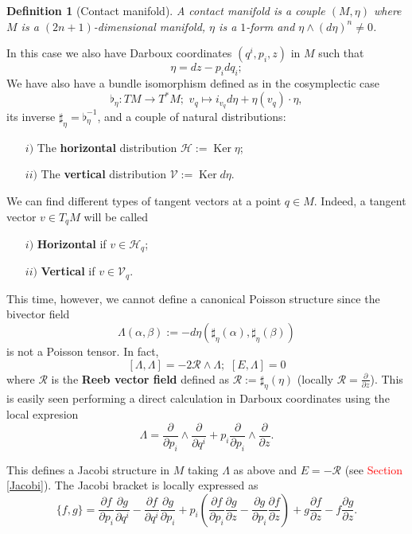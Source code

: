 \documentclass[12pt]{article}
\newtheorem{Def}{Definition}[section]
\renewcommand{\ker}{\operatorname{Ker}}
\begin{document}
\begin{Def}[Contact manifold] A
contact manifold is a couple $(M, \eta)$ where $M$ is a $(2n+1)$-dimensional manifold, $\eta$ is a $1$-form and $\eta \wedge ( d\eta)^n \neq 0$. \end{Def} 
 In this case we also have Darboux coordinates $(q^i,p_i,z)$ in $M$  \cites{godbillon1969geometrie} such that $$\eta = dz - p_idq_i; $$
We have also have a bundle isomorphism defined as in the cosymplectic case $$\flat_{\eta}: TM \rightarrow T^* M ; \,\, v_q \mapsto
i_{v_q}d\eta + \eta(v_q)\cdot \eta,$$ its inverse $\sharp_\eta = \flat_ \eta^{-1}$, and a couple of natural distributions:
\begin{itemize}
\item[$i)$] The \textbf{horizontal} distribution $\mathcal{H}:= \ker \eta$;
\item[$ii)$] The \textbf{vertical} distribution $\mathcal{V}:= \ker d\eta$.
\end{itemize}
We can find different types of tangent vectors at a point $q \in M$. Indeed, a tangent vector $v \in T_qM$ will be called
\begin{itemize}
\item[$i)$] \textbf{Horizontal} if $v \in \mathcal{H}_q$;
\item[$ii)$] \textbf{Vertical} if $v \in \mathcal{V}_q$.
\end{itemize}

This time, however, we cannot define a canonical Poisson structure since the bivector field $$\Lambda(\alpha,\beta):= -d\eta(\sharp_{\eta}(\alpha), \sharp_{\eta}(\beta))$$ is not a Poisson tensor. In fact, $$[\Lambda,\Lambda] = - 2 \mathcal{R} \wedge \Lambda; \,\, [E, \Lambda] = 0$$ where $\mathcal{R}$ is the \textbf{Reeb vector field} defined as $\mathcal{R} := \sharp_{\eta}(\eta)$ (locally $\mathcal{R} = \frac{\partial}{\partial z}$). This is easily seen performing a direct calculation in Darboux coordinates using the local expresion $$\Lambda = \frac{\partial}{\partial p_i}\wedge \frac{\partial}{\partial q^i} + p_i \frac{\partial}{\partial p_i} \wedge \frac{\partial}{\partial z}.$$

 This defines a Jacobi structure in $M$ taking $\Lambda$ as above and $E = - \mathcal{R}$ (see \textcolor{red}{Section \ref{Jacobi}}). The Jacobi bracket is locally expressed as $$\{f,g\} =  \frac{\partial f}{\partial p_i}\frac{\partial g}{\partial q^i}- \frac{\partial f}{\partial q^i} \frac{\partial g}{\partial p_i} + p_i\left (  \frac{\partial f}{\partial p_i}\frac{\partial g}{\partial z}- \frac{\partial g}{\partial p_i} \frac{\partial f}{\partial z} \right ) + g \frac{\partial f}{\partial z} - f\frac{\partial g}{\partial z}.$$
\end{document}

